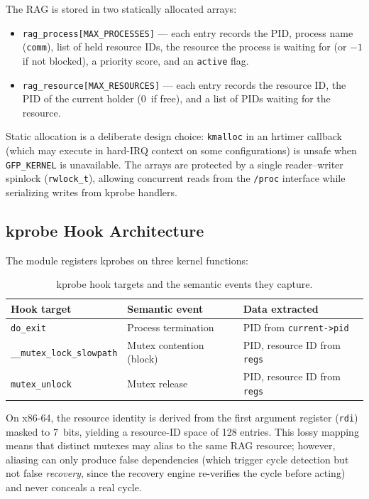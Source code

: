 \documentclass[11pt,letterpaper]{article}
\begin{document}
The RAG is stored in two statically allocated arrays:

\begin{itemize}
\item \texttt{rag\_process[MAX\_PROCESSES]} --- each entry records the
  PID, process name (\texttt{comm}), list of held resource IDs, the
  resource the process is waiting for (or $-1$ if not blocked), a
  priority score, and an \texttt{active} flag.
\item \texttt{rag\_resource[MAX\_RESOURCES]} --- each entry records the
  resource ID, the PID of the current holder (0~if free), and a list of
  PIDs waiting for the resource.
\end{itemize}

Static allocation is a deliberate design choice: \texttt{kmalloc} in an
hrtimer callback (which may execute in hard-IRQ context on some
configurations) is unsafe when \texttt{GFP\_KERNEL} is unavailable.
The arrays are protected by a single reader--writer spinlock
(\texttt{rwlock\_t}), allowing concurrent reads from the \texttt{/proc}
interface while serializing writes from kprobe handlers.

\subsection{kprobe Hook Architecture}

The module registers kprobes on three kernel functions:

\begin{table}[h]
\centering
\begin{tabular}{lll}
\toprule
\textbf{Hook target} & \textbf{Semantic event} & \textbf{Data extracted} \\
\midrule
\texttt{do\_exit} & Process termination & PID from \texttt{current->pid} \\
\texttt{\_\_mutex\_lock\_slowpath} & Mutex contention (block) & PID, resource ID from \texttt{regs} \\
\texttt{mutex\_unlock} & Mutex release & PID, resource ID from \texttt{regs} \\
\bottomrule
\end{tabular}
\caption{kprobe hook targets and the semantic events they capture.}
\end{table}

On x86-64, the resource identity is derived from the first argument
register (\texttt{rdi}) masked to 7~bits, yielding a resource-ID space
of 128 entries.  This lossy mapping means that distinct mutexes may
alias to the same RAG resource; however, aliasing can only produce false
dependencies (which trigger cycle detection but not false
\emph{recovery}, since the recovery engine re-verifies the cycle before
acting) and never conceals a real cycle.
\end{document}
